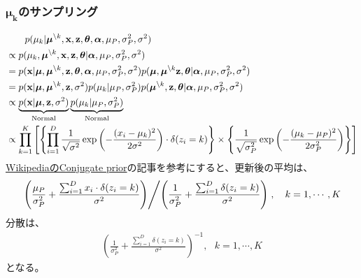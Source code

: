 \documentclass[a4paper,10.5pt,uplatex]{jsarticle}  %
\newcommand{\btheta}{\boldsymbol{\theta}}
\newcommand{\balpha}{\boldsymbol{\alpha}}
\newcommand{\bmu}{\boldsymbol{\mu}}
\newcommand{\bz}{\mathbf{z}}
\newcommand{\bx}{\mathbf{x}}
\begin{document}
\subsubsection{$\boldsymbol{\mu_k}$のサンプリング}
\begin{align}
  &\qquad p(\mu_k | \bmu^{\backslash k}, \bx, \bz, \btheta, \balpha, \mu_P, \sigma^2_P, \sigma^2) \\
  &\propto p(\mu_k, \bmu^{\backslash k}, \bx, \bz, \btheta | \balpha, \mu_P, \sigma^2_P, \sigma^2)\\
  &= p(\bx | \bmu, \bmu^{\backslash k}, \bz, \btheta, \balpha, \mu_P, \sigma_P^2, \sigma^2) p(\bmu, \bmu^{\backslash k} \bz, \btheta | \balpha, \mu_P, \sigma_P^2, \sigma^2)\\
  &= p(\bx | \bmu, \bmu^{\backslash k}, \bz, \sigma^2) p(\mu_k | \mu_P, \sigma^2_P) p(\bmu^{\backslash k}, \bz, \btheta | \balpha, \mu_P, \sigma_P^2, \sigma^2)\\
  &\propto \underbrace{p(\bx | \bmu, \bz, \sigma^2)}_{\rm Normal} \underbrace{ p(\mu_k | \mu_P, \sigma^2_P)}_{\rm Normal} \\
  &\propto \prod_{k=1}^{K} \left[ \left\{ \prod_{i=1}^{D} \frac{1}{\sqrt{\sigma^2}} \exp \left( - \frac{(x_i - \mu_k)^2}{2 \sigma^2} \right)  \cdot \delta(z_i = k) \right\} \times \left\{  \frac{1}{\sqrt{\sigma_P^2}} \exp \left(  - \frac{(\mu_k - \mu_P)^2}{2 \sigma_P^2} \right) \right\} \right]
\end{align}
\href{https://en.wikipedia.org/wiki/Conjugate_prior#Table_of_conjugate_distributions}{WikipediaのConjugate prior}の記事を参考にすると、更新後の平均は、
\begin{align}
  \left. \left( \frac{\mu_P}{\sigma_P^2} + \frac{\sum_{i=1}^{D} x_i \cdot \delta(z_i=k)}{\sigma^2} \right) \middle/ \left( \frac{1}{\sigma_P^2} + \frac{\sum_{i=1}^{D} \delta (z_i = k)}{\sigma^2} \right)   \right. , \ \ \ k=1, \cdots, K
\end{align}
分散は、
\begin{align}
  \left( \frac{1}{\sigma^2_P} + \frac{\sum_{i=1}^{D} \delta(z_i=k)}{\sigma^2} \right)^{-1} , \ \ \ k=1, \cdots, K
\end{align}
となる。
\end{document}
